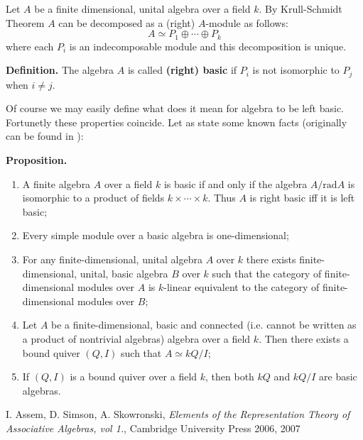 \documentclass[12pt]{article}
\begin{document}
Let $A$ be a finite dimensional, unital algebra over a field $k$. By Krull-Schmidt Theorem $A$ can be decomposed as a (right) $A$-module as follows:
$$A\simeq P_1\oplus\cdots\oplus P_k$$
where each $P_i$ is an indecomposable module and this decomposition is unique. 

\textbf{Definition.} The algebra $A$ is called \textbf{(right) basic} if $P_i$ is not isomorphic to $P_j$ when $i\neq j$.

Of course we may easily define what does it mean for algebra to be left basic. Fortunetly these properties coincide. Let as state some known facts (originally can be found in \cite{ASS}):

\textbf{Proposition.}
\begin{enumerate}
\item A finite algebra $A$ over a field $k$ is basic if and only if the algebra $A/\mathrm{rad}A$ is isomorphic to a product of fields $k\times\cdots\times k$. Thus $A$ is right basic iff it is left basic;
\item Every simple module over a basic algebra is one-dimensional;
\item For any finite-dimensional, unital algebra $A$ over $k$ there exists finite-dimensional, unital, basic algebra $B$ over $k$ such that the category of finite-dimensional modules over $A$ is $k$-linear equivalent to the category of finite-dimensional modules over $B$;
\item Let $A$ be a finite-dimensional, basic and connected (i.e. cannot be written as a product of nontrivial algebras) algebra over a field $k$. Then there exists a bound quiver $(Q,I)$ such that $A\simeq kQ/I$;
\item If $(Q,I)$ is a bound quiver over a field $k$, then both $kQ$ and $kQ/I$ are basic algebras.
\end{enumerate}

\begin{thebibliography}{99}
 I. Assem, D. Simson, A. Skowronski, \textit{Elements of the Representation Theory of Associative Algebras, vol 1.}, Cambridge University Press 2006, 2007
\end{thebibliography}

\end{document}

